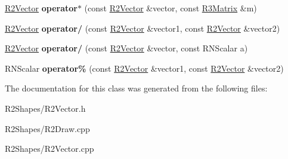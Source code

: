 \begin{DoxyCompactItemize}
\item 
\hyperlink{class_r2_vector}{R2\+Vector} {\bfseries operator$\ast$} (const \hyperlink{class_r2_vector}{R2\+Vector} \&vector, const \hyperlink{class_r3_matrix}{R3\+Matrix} \&m)\hypertarget{class_r2_vector_a4766dd8eed3f662a2dd9e6c778412dc1}{}\label{class_r2_vector_a4766dd8eed3f662a2dd9e6c778412dc1}

\item 
\hyperlink{class_r2_vector}{R2\+Vector} {\bfseries operator/} (const \hyperlink{class_r2_vector}{R2\+Vector} \&vector1, const \hyperlink{class_r2_vector}{R2\+Vector} \&vector2)\hypertarget{class_r2_vector_a60b7391a208d40547391f784d56c829a}{}\label{class_r2_vector_a60b7391a208d40547391f784d56c829a}

\item 
\hyperlink{class_r2_vector}{R2\+Vector} {\bfseries operator/} (const \hyperlink{class_r2_vector}{R2\+Vector} \&vector, const R\+N\+Scalar a)\hypertarget{class_r2_vector_ab7aaea5cfb8669ff074b5722b569f64d}{}\label{class_r2_vector_ab7aaea5cfb8669ff074b5722b569f64d}

\item 
R\+N\+Scalar {\bfseries operator\%} (const \hyperlink{class_r2_vector}{R2\+Vector} \&vector1, const \hyperlink{class_r2_vector}{R2\+Vector} \&vector2)\hypertarget{class_r2_vector_a03c9a4bbce9ee09be5bb8bf2bb05c2a1}{}\label{class_r2_vector_a03c9a4bbce9ee09be5bb8bf2bb05c2a1}

\end{DoxyCompactItemize}


The documentation for this class was generated from the following files\+:\begin{DoxyCompactItemize}
\item 
R2\+Shapes/R2\+Vector.\+h\item 
R2\+Shapes/R2\+Draw.\+cpp\item 
R2\+Shapes/R2\+Vector.\+cpp\end{DoxyCompactItemize}

